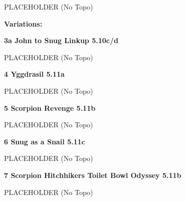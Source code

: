 \begin{multicols}{2}
			\begin{adjustwidth}{0.5cm}{}			
			PLACEHOLDER (No Topo)
			\end{adjustwidth}
			
				\begin{adjustwidth}{0.5cm}{}				
				\needspace{3cm}
				\textbf{Variations:} \newline
					
					\needspace{1.5cm}
\label{vr:John to Snug Linkup}
\colorbox{RoyalBlue!20}{
\parbox{0.95\linewidth}{
\textbf{
3a John to Snug Linkup 5.10c/d  
}}}

					\begin{adjustwidth}{0.5cm}{}			
					PLACEHOLDER (No Topo)
					\end{adjustwidth}
					
					
				\end{adjustwidth}
			
			
			\needspace{1.5cm}
\label{rt:Yggdrasil}
\colorbox{RoyalBlue!20}{
\parbox{0.95\linewidth}{
\textbf{
4 Yggdrasil 5.11a  
}}}

			\begin{adjustwidth}{0.5cm}{}			
			PLACEHOLDER (No Topo)
			\end{adjustwidth}
			
			
			
			\needspace{1.5cm}
\label{rt:Scorpion Revenge}
\colorbox{RoyalBlue!20}{
\parbox{0.95\linewidth}{
\textbf{
5 Scorpion Revenge 5.11b  
}}}

			\begin{adjustwidth}{0.5cm}{}			
			PLACEHOLDER (No Topo)
			\end{adjustwidth}
			
			
			
			\needspace{1.5cm}
\label{rt:Snug as a Snail}
\colorbox{RoyalBlue!20}{
\parbox{0.95\linewidth}{
\textbf{
6 Snug as a Snail 5.11c  
}}}

			\begin{adjustwidth}{0.5cm}{}			
			PLACEHOLDER (No Topo)
			\end{adjustwidth}
			
			
			
			\needspace{1.5cm}
\label{rt:Scorpion Hitchhikers Toilet Bowl Odyssey}
\colorbox{RoyalBlue!20}{
\parbox{0.95\linewidth}{
\textbf{
7 Scorpion Hitchhikers Toilet Bowl Odyssey 5.11b  
}}}

			\begin{adjustwidth}{0.5cm}{}			
			PLACEHOLDER (No Topo)
			\end{adjustwidth}
			

\end{multicols}
